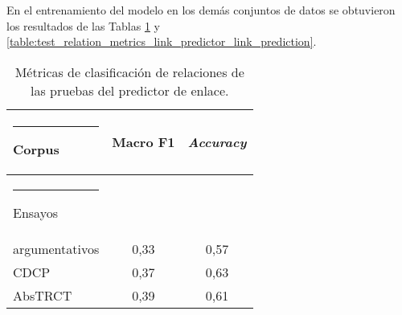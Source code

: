 \documentclass[a4paper,11pt,twocolumn,twoside]{article}
\begin{document}



En el entrenamiento del modelo en los demás conjuntos de datos se obtuvieron los resultados de las Tablas 
\ref{table:test_relation_metrics_link_predictor_relation_classification} y 
\ref{table:test_relation_metrics_link_predictor_link_prediction}.

\begin{table}[h]
	\begin{center}
		\begin{tabular}{|l|c|c|} 
			\hline\rule{-2pt}{15pt}
			{\bf Corpus}                 & {\bf Macro F1} & {\bf \textit{Accuracy}} \\
			\hline\rule{-4pt}{10pt}
			Ensayos				 		 & 				  & 						\\ 
			argumentativos 		 		 & 0,33			  & 0,57					\\ 
			CDCP                   		 & 0,37			  & 0,63					\\ 
			AbsTRCT               		 & 0,39			  & 0,61					\\ 
			\hline
		\end{tabular}
	\end{center}
	\caption{\label{table:test_relation_metrics_link_predictor_relation_classification}Métricas de clasificación de relaciones de las pruebas del predictor de enlace.}
\end{table}
\end{document}
